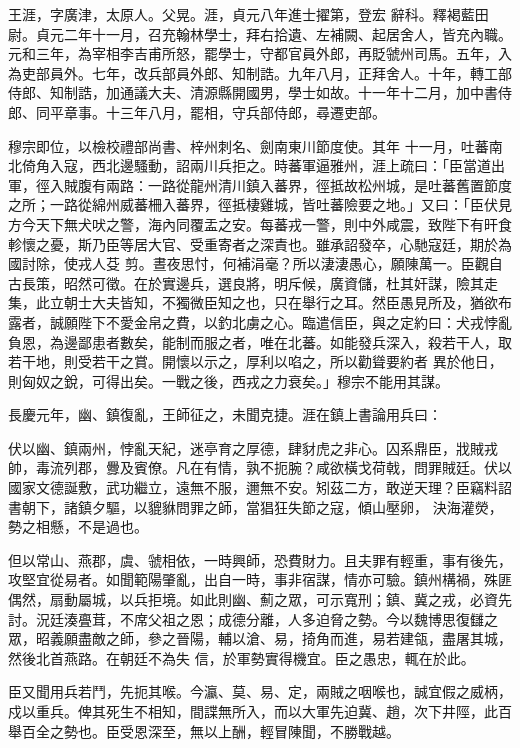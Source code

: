 \begin{pinyinscope}
 王涯，字廣津，太原人。父晃。涯，貞元八年進士擢第，登宏
 辭科。釋褐藍田尉。貞元二年十一月，召充翰林學士，拜右拾遺、左補闕、起居舍人，皆充內職。元和三年，為宰相李吉甫所怒，罷學士，守都官員外郎，再貶虢州司馬。五年，入為吏部員外。七年，改兵部員外郎、知制誥。九年八月，正拜舍人。十年，轉工部侍郎、知制誥，加通議大夫、清源縣開國男，學士如故。十一年十二月，加中書侍郎、同平章事。十三年八月，罷相，守兵部侍郎，尋遷吏部。



 穆宗即位，以檢校禮部尚書、梓州刺名、劍南東川節度使。其年
 十一月，吐蕃南北倚角入寇，西北邊騷動，詔兩川兵拒之。時蕃軍逼雅州，涯上疏曰：「臣當道出軍，徑入賊腹有兩路：一路從龍州清川鎮入蕃界，徑抵故松州城，是吐蕃舊置節度之所；一路從綿州威蕃柵入蕃界，徑抵棲雞城，皆吐蕃險要之地。」又曰：「臣伏見方今天下無犬吠之警，海內同覆盂之安。每蕃戎一警，則中外咸震，致陛下有旰食軫懷之憂，斯乃臣等居大官、受重寄者之深責也。雖承詔發卒，心馳寇廷，期於為國討除，使戎人芟
 剪。晝夜思忖，何補涓毫？所以淒淒愚心，願陳萬一。臣觀自古長策，昭然可徵。在於實邊兵，選良將，明斥候，廣資儲，杜其奸謀，險其走集，此立朝士大夫皆知，不獨微臣知之也，只在舉行之耳。然臣愚見所及，猶欲布露者，誠願陛下不愛金帛之費，以釣北虜之心。臨遣信臣，與之定約曰：犬戎悖亂負恩，為邊鄙患者數矣，能制而服之者，唯在北蕃。如能發兵深入，殺若干人，取若干地，則受若干之賞。開懷以示之，厚利以啗之，所以勸聳要約者
 異於他日，則匈奴之銳，可得出矣。一戰之後，西戎之力衰矣。」穆宗不能用其謀。



 長慶元年，幽、鎮復亂，王師征之，未聞克捷。涯在鎮上書論用兵曰：



 伏以幽、鎮兩州，悖亂天紀，迷亭育之厚德，肆豺虎之非心。囚系鼎臣，戕賊戎帥，毒流列郡，釁及賓僚。凡在有情，孰不扼腕？咸欲橫戈荷戟，問罪賊廷。伏以國家文德誕敷，武功繼立，遠無不服，邇無不安。矧茲二方，敢逆天理？臣竊料詔書朝下，諸鎮夕驅，以貔貅問罪之師，當猖狂失節之寇，傾山壓卵，
 決海灌熒，勢之相懸，不是過也。



 但以常山、燕郡，虞、虢相依，一時興師，恐費財力。且夫罪有輕重，事有後先，攻堅宜從易者。如聞範陽肇亂，出自一時，事非宿謀，情亦可驗。鎮州構禍，殊匪偶然，扇動屬城，以兵拒境。如此則幽、薊之眾，可示寬刑；鎮、冀之戎，必資先討。況廷湊亹茸，不席父祖之恩；成德分離，人多迫脅之勢。今以魏博思復讎之眾，昭義願盡敵之師，參之晉陽，輔以滄、易，掎角而進，易若建瓴，盡屠其城，然後北首燕路。在朝廷不為失
 信，於軍勢實得機宜。臣之愚忠，輒在於此。



 臣又聞用兵若鬥，先扼其喉。今瀛、莫、易、定，兩賊之咽喉也，誠宜假之威柄，戍以重兵。俾其死生不相知，間諜無所入，而以大軍先迫冀、趙，次下井陘，此百舉百全之勢也。臣受恩深至，無以上酬，輕冒陳聞，不勝戰越。




\end{pinyinscope}
